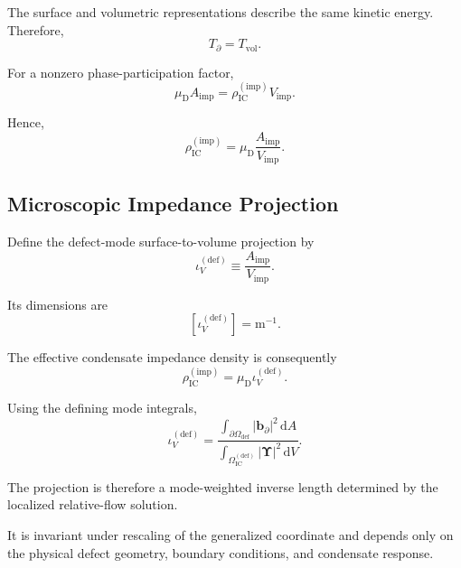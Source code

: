 The surface and volumetric representations describe the same kinetic energy. Therefore,
\begin{equation}
    T_{\partial} = T_{\mathrm{vol}}.
\end{equation}

For a nonzero phase-participation factor,
\begin{equation}
    \mu_{\mathrm{D}}A_{\mathrm{imp}} = \rho_{\mathrm{IC}}^{(\mathrm{imp})} V_{\mathrm{imp}}.
\end{equation}

Hence,
\begin{equation}
    \boxed{ \rho_{\mathrm{IC}}^{(\mathrm{imp})} = \mu_{\mathrm{D}} \frac{A_{\mathrm{imp}}}{V_{\mathrm{imp}}} }.
\end{equation}

\subsection{Microscopic Impedance Projection}

Define the defect-mode surface-to-volume projection by
\begin{equation}
    \boxed{ \iota_V^{(\mathrm{def})} \equiv \frac{A_{\mathrm{imp}}}{V_{\mathrm{imp}}} }.
\end{equation}

Its dimensions are
\begin{equation}
    \left[ \iota_V^{(\mathrm{def})} \right] = \mathrm{m}^{-1}.
\end{equation}

The effective condensate impedance density is consequently
\begin{equation}
    \boxed{ \rho_{\mathrm{IC}}^{(\mathrm{imp})} = \mu_{\mathrm{D}} \iota_V^{(\mathrm{def})} }.
\end{equation}

Using the defining mode integrals,
\begin{equation}
    \boxed{ \iota_V^{(\mathrm{def})} = \frac{ \displaystyle \int_{\partial\Omega_{\mathrm{def}}} \left| \mathbf{b}_{\partial} \right|^2 \, \mathrm{d}A }{ \displaystyle \int_{\Omega_{\mathrm{IC}}^{(\mathrm{def})}} \left| \boldsymbol{\Upsilon} \right|^2 \, \mathrm{d}V } }.
\end{equation}

The projection is therefore a mode-weighted inverse length determined by the localized relative-flow solution.

It is invariant under rescaling of the generalized coordinate and depends only on the physical defect geometry, boundary conditions, and condensate response.

